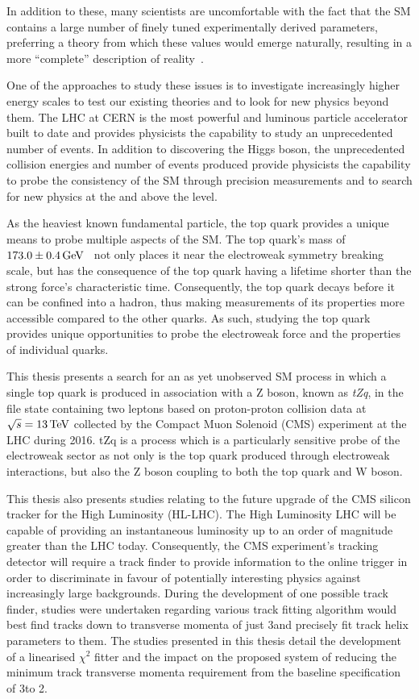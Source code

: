 In addition to these, many scientists are uncomfortable with the fact that the SM contains a large number of finely tuned experimentally derived parameters, preferring a theory from which these values would emerge naturally, resulting in a more ``complete'' description of reality~\cite{Burdman:2007ck}.

One of the approaches to study these issues is to investigate increasingly higher energy scales to test our existing theories and to look for new physics beyond them.
The LHC at CERN is the most powerful and luminous particle accelerator built to date and provides physicists the capability to study an unprecedented number of events.
In addition to discovering the Higgs boson, the unprecedented collision energies and number of events produced provide physicists the capability to probe the consistency of the SM through precision measurements and to search for new physics at the and above the \TeV level.

As the heaviest known fundamental particle, the top quark provides a unique means to probe multiple aspects of the SM.
The top quark's mass of $173.0 \pm 0.4 \,\text{Ge\hspace{-.08em}V}$~\cite{Tanabashi:2018oca} not only places it near the electroweak symmetry breaking scale, but has the consequence of the top quark having a lifetime shorter than the strong force's characteristic time.
Consequently, the top quark decays before it can be confined into a hadron, thus making measurements of its properties more accessible compared to the other quarks.
As such, studying the top quark provides unique opportunities to probe the electroweak force and the properties of individual quarks.

This thesis presents a search for an as yet unobserved SM process in which a single top quark is produced  in association with a Z boson, known as \emph{tZq}, in the file state containing two leptons based on proton-proton collision data at $\sqrt{s} = 13\,\text{Te\hspace{-.08em}V}$ collected by the Compact Muon Solenoid (CMS) experiment at the LHC during 2016.
tZq is a process which is a particularly sensitive probe of the electroweak sector as not only is the top quark produced through electroweak interactions, but also the Z boson coupling to both the top quark and W boson.

This thesis also presents studies relating to the future upgrade of the CMS silicon tracker for the High Luminosity (HL-LHC).
The High Luminosity LHC will be capable of providing an instantaneous luminosity up to an order of magnitude greater than the LHC today.
Consequently, the CMS experiment's tracking detector will require a track finder to provide information to the online trigger in order to discriminate in favour of potentially interesting physics against increasingly large backgrounds.
During the development of one possible track finder, studies were undertaken regarding various track fitting algorithm would best find tracks down to transverse momenta of just 3\GeV and precisely fit track helix parameters to them.
The studies presented in this thesis detail the development of a linearised $\chi^{2}$ fitter and the impact on the proposed system of reducing the minimum track transverse momenta requirement from the baseline specification of 3\GeV to 2\GeV.
